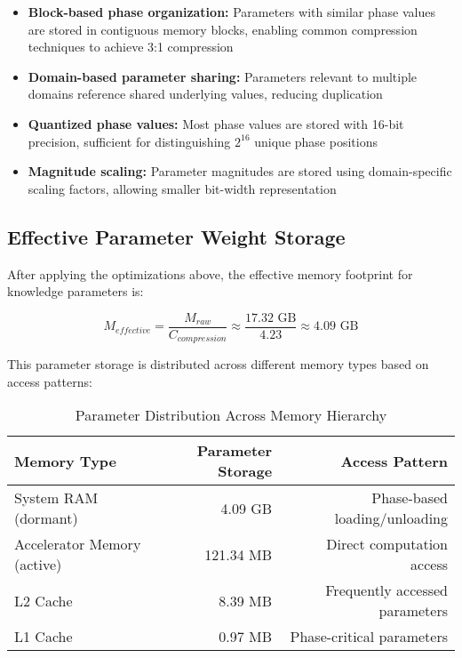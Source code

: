 \begin{tcolorbox}[colback=LightGray, colframe=DarkGray, title=Parameter Compression \& Storage Optimization, fonttitle=\bfseries]
\begin{itemize}
    \item \textbf{Block-based phase organization:} Parameters with similar phase values are stored in contiguous memory blocks, enabling common compression techniques to achieve 3:1 compression
    \item \textbf{Domain-based parameter sharing:} Parameters relevant to multiple domains reference shared underlying values, reducing duplication
    \item \textbf{Quantized phase values:} Most phase values are stored with 16-bit precision, sufficient for distinguishing $2^{16}$ unique phase positions
    \item \textbf{Magnitude scaling:} Parameter magnitudes are stored using domain-specific scaling factors, allowing smaller bit-width representation
\end{itemize}
\end{tcolorbox}

\subsection{Effective Parameter Weight Storage}

After applying the optimizations above, the effective memory footprint for knowledge parameters is:

\begin{equation}
M_{effective} = \frac{M_{raw}}{C_{compression}} \approx \frac{17.32 \text{ GB}}{4.23} \approx 4.09 \text{ GB}
\end{equation}

This parameter storage is distributed across different memory types based on access patterns:

\begin{table}[h]
\centering
\begin{tabular}{|l|r|r|}
\hline
\textbf{Memory Type} & \textbf{Parameter Storage} & \textbf{Access Pattern} \\
\hline
System RAM (dormant) & 4.09 GB & Phase-based loading/unloading \\
\hline
Accelerator Memory (active) & 121.34 MB & Direct computation access \\
\hline
L2 Cache & 8.39 MB & Frequently accessed parameters \\
\hline
L1 Cache & 0.97 MB & Phase-critical parameters \\
\hline
\end{tabular}
\caption{Parameter Distribution Across Memory Hierarchy}
\end{table}

